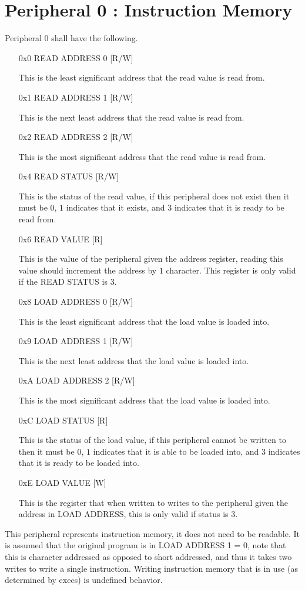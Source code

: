 \documentclass[12pt,letterpaper]{report}
\newcommand{\ronly}{[R]}
\newcommand{\wonly}{[W]}
\newcommand{\rw}{[R/W]}
\begin{document}
\section{Peripheral 0 : Instruction Memory}
\label{peripheral:Instruction Memory}
Peripheral $0$ shall have the following.
\begin{enumerate}
\item[0x0] READ ADDRESS 0 \rw

This is the least significant address that the read value is read from.
\item[0x1] READ ADDRESS 1 \rw

This is the next least address that the read value is read from.
\item[0x2] READ ADDRESS 2 \rw

This is the most significant address that the read value is read from.
\item[0x4] READ STATUS \rw

This is the status of the read value, if this peripheral does not exist then it must be $0$, $1$ indicates that it exists, and $3$ indicates that it is ready to be read from.
\item[0x6] READ VALUE \ronly

This is the value of the peripheral given the address register, reading this value should increment the address by $1$ character. This register is only valid if the READ STATUS is $3$.
\item[0x8] LOAD ADDRESS 0 \rw

This is the least significant address that the load value is loaded into.
\item[0x9] LOAD ADDRESS 1 \rw

This is the next least address that the load value is loaded into.
\item[0xA] LOAD ADDRESS 2 \rw

This is the most significant address that the load value is loaded into.
\item[0xC] LOAD STATUS \ronly

This is the status of the load value, if this peripheral cannot be written to then it must be $0$, $1$ indicates that it is able to be loaded into, and $3$ indicates that it is ready to be loaded into.
\item[0xE] LOAD VALUE \wonly

This is the register that when written to writes to the peripheral given the address in LOAD ADDRESS, this is only valid if status is $3$.
\end{enumerate}
This peripheral represents instruction memory, it does not need to be readable. It is assumed that the original program is in LOAD ADDRESS 1 = 0, note that this is character addressed as opposed to short addressed, and thus it takes two writes to write a single instruction. Writing instruction memory that is in use (as determined by execs) is undefined behavior.
\end{document}
